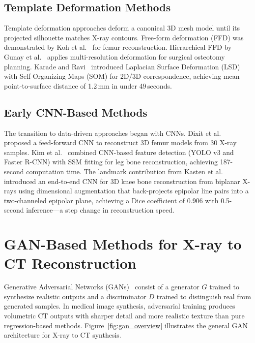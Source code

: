 \documentclass[10pt,twocolumn,a4paper]{article}
\begin{document}
\subsection{Template Deformation Methods}
\label{sec:past:deform}

Template deformation approaches deform a canonical 3D mesh model until its
projected silhouette matches X-ray contours. Free-form deformation (FFD) was
demonstrated by Koh et al.~\cite{koh2011} for femur reconstruction. Hierarchical
FFD by Gunay et al.~\cite{gunay2007} applies multi-resolution deformation for
surgical osteotomy planning. Karade and Ravi~\cite{karade2015} introduced
Laplacian Surface Deformation (LSD) with Self-Organizing Maps (SOM) for 2D/3D
correspondence, achieving mean point-to-surface distance of 1.2\,mm in under
49\,seconds.

\subsection{Early CNN-Based Methods}
\label{sec:past:cnn}

The transition to data-driven approaches began with CNNs. Dixit et
al.~\cite{dixit2019} proposed a feed-forward CNN to reconstruct 3D femur models
from 30 X-ray samples. Kim et al.~\cite{kim2019} combined CNN-based feature
detection (YOLO v3 and Faster R-CNN) with SSM fitting for leg bone
reconstruction, achieving 187-second computation time. The landmark contribution
from Kasten et al.~\cite{kasten2020} introduced an end-to-end CNN for 3D knee
bone reconstruction from biplanar X-rays using dimensional augmentation that
back-projects epipolar line pairs into a two-channeled epipolar plane, achieving
a Dice coefficient of 0.906 with 0.5-second inference---a step change in
reconstruction speed.

\section{GAN-Based Methods for X-ray to CT Reconstruction}
\label{sec:gan}

Generative Adversarial Networks (GANs)~\cite{goodfellow2014} consist of a
generator $G$ trained to synthesize realistic outputs and a discriminator $D$
trained to distinguish real from generated samples. In medical image synthesis,
adversarial training produces volumetric CT outputs with sharper detail and more
realistic texture than pure regression-based methods. Figure~\ref{fig:gan_overview}
illustrates the general GAN architecture for X-ray to CT synthesis.
\end{document}
